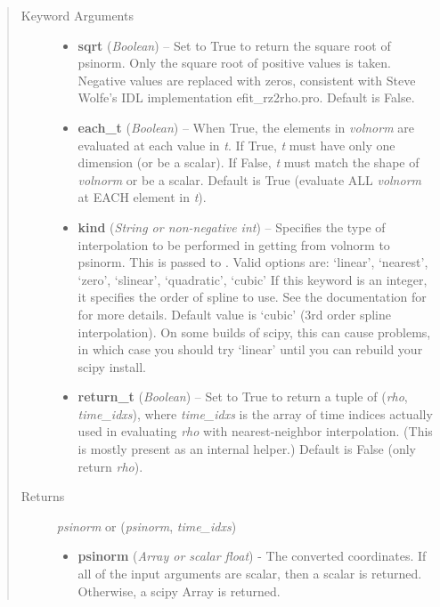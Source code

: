 \documentclass[letterpaper,10pt,english]{sphinxmanual}
\begin{document}
\begin{fulllineitems}
\begin{fulllineitems}
\begin{quote}
\begin{description}
\begin{itemize}
\end{itemize}

\item[{Keyword Arguments}] \leavevmode\begin{itemize}
\item {} 
\textbf{sqrt} (\emph{Boolean}) --
Set to True to return the square root of psinorm.
Only the square root of positive values is taken. Negative
values are replaced with zeros, consistent with Steve Wolfe's
IDL implementation efit\_rz2rho.pro. Default is False.

\item {} 
\textbf{each\_t} (\emph{Boolean}) --
When True, the elements in \emph{volnorm} are evaluated
at each value in \emph{t}. If True, \emph{t} must have only one dimension
(or be a scalar). If False, \emph{t} must match the shape of \emph{volnorm}
or be a scalar. Default is True (evaluate ALL \emph{volnorm} at EACH
element in \emph{t}).

\item {} 
\textbf{kind} (\emph{String or non-negative int}) --
Specifies the type of
interpolation to be performed in getting from volnorm to
psinorm. This is passed to
. Valid options are:
`linear', `nearest', `zero', `slinear', `quadratic', `cubic'
If this keyword is an integer, it specifies the order of spline
to use. See the documentation for  for more
details. Default value is `cubic' (3rd order spline
interpolation). On some builds of scipy, this can cause problems,
in which case you should try `linear' until you can rebuild your
scipy install.

\item {} 
\textbf{return\_t} (\emph{Boolean}) --
Set to True to return a tuple of (\emph{rho},
\emph{time\_idxs}), where \emph{time\_idxs} is the array of time indices
actually used in evaluating \emph{rho} with nearest-neighbor
interpolation. (This is mostly present as an internal helper.)
Default is False (only return \emph{rho}).

\end{itemize}

\item[{Returns}] \leavevmode

\emph{psinorm} or (\emph{psinorm}, \emph{time\_idxs})
\begin{itemize}
\item {} 
\textbf{psinorm} (\emph{Array or scalar float}) - The converted coordinates. If
all of the input arguments are scalar, then a scalar is returned.
Otherwise, a scipy Array is returned.


\end{itemize}
\end{description}
\end{quote}
\end{fulllineitems}
\end{fulllineitems}
\end{document}
